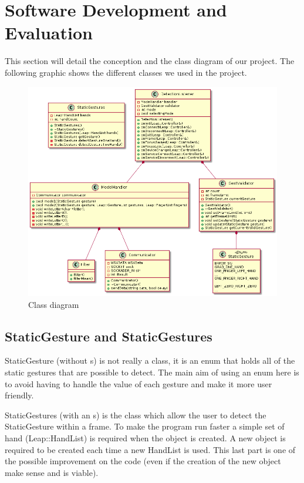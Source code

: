 \section{Software Development and Evaluation}

This section will detail the conception and the class diagram of our project. The following graphic shows the different classes we used in the project.

\begin{figure}[H]
 \centering
 \includegraphics[scale=0.5]{../uml/classDiagram.png}
 \caption{Class diagram}
\end{figure}

\subsection{StaticGesture and StaticGestures}

StaticGesture (without s) is not really a class, it is an enum that holds all of the static gestures that are possible to detect. The main aim of using an enum here is to avoid having to handle the value of each gesture and make it more user friendly.

StaticGestures (with an s) is the class which allow the user to detect the StaticGesture within a frame. To make the program run faster a simple set of hand (Leap::HandList) is required when the object is created. A new object is required to be created each time a new HandList is used. This last part is one of the possible improvement on the code (even if the creation of the new object make sense and is viable).

